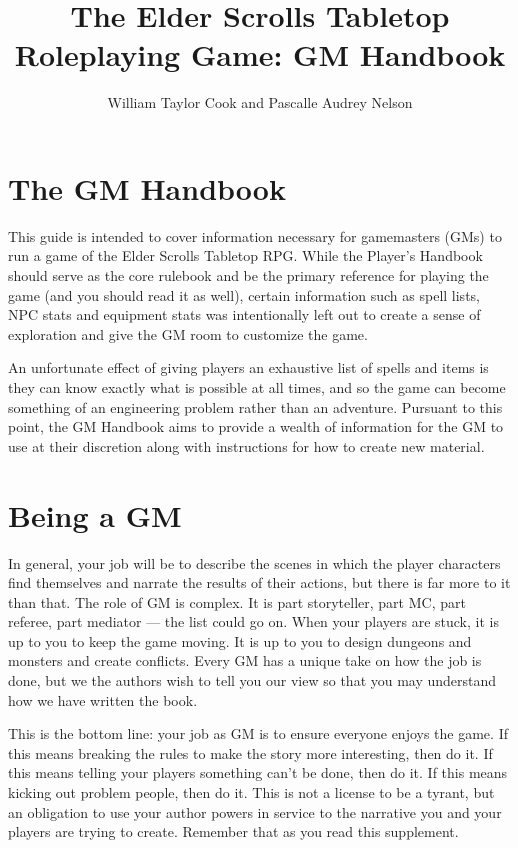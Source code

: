 \documentclass[12pt]{book}
\title{The Elder Scrolls Tabletop Roleplaying Game: GM Handbook}
\author{William Taylor Cook and Pascalle Audrey Nelson}
\begin{document}
\maketitle

\section*{The GM Handbook}
This guide is intended to cover information necessary for gamemasters (GMs) to run a game of the Elder Scrolls Tabletop RPG. While the Player's Handbook should serve as the core rulebook and be the primary reference for playing the game (and you should read it as well), certain information such as spell lists, NPC stats and equipment stats was intentionally left out to create a sense of exploration and give the GM room to customize the game.

An unfortunate effect of giving players an exhaustive list of spells and items is they can know exactly what is possible at all times, and so the game can become something of an engineering problem rather than an adventure. Pursuant to this point, the GM Handbook aims to provide a wealth of information for the GM to use at their discretion along with instructions for how to create new material.

\section*{Being a GM}
In general, your job will be to describe the scenes in which the player characters find themselves and narrate the results of their actions, but there is far more to it than that. The role of GM is complex. It is part storyteller, part MC, part referee, part mediator --- the list could go on. When your players are stuck, it is up to you to keep the game moving. It is up to you to design dungeons and monsters and create conflicts. Every GM has a unique take on how the job is done, but we the authors wish to tell you our view so that you may understand how we have written the book.

This is the bottom line: your job as GM is to ensure everyone enjoys the game. If this means breaking the rules to make the story more interesting, then do it. If this means telling your players something can't be done, then do it. If this means kicking out problem people, then do it. This is not a license to be a tyrant, but an obligation to use your author powers in service to the narrative you and your players are trying to create. Remember that as you read this supplement.
\end{document}
